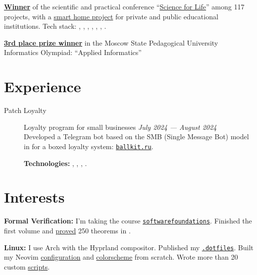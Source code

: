 \documentclass[margin,line]{resume}
\begin{document}
\begin{resume}
  \textbf{\href{https://alchemmist.github.io/CV/attachments/scince-for-life-win.pdf}{Winner}}
  of the scientific and practical conference
  “\href{https://conf.profil.mos.ru/academ}{Science for Life}” among
  117 projects, with a
  \href{https://github.com/smart-cab/}{smart home project} for
  private and public educational institutions.
  Tech stack: ,
  , , ,
  , , .

  \textbf{\href{https://alchemmist.github.io/CV/attachments/informatics-olimpic.pdf}{3rd
  place prize winner}} in the Moscow State Pedagogical University
  Informatics Olympiad: “Applied Informatics”

  \vspace{-2mm}
  \section{\mysidestyle Experience}\vspace{2mm}

  \begin{description}

    \item[Patch Loyalty] Loyalty program for small businesses \hfill
      \textsl{July 2024 — August 2024\vspace{1mm}}\\
      Developed a Telegram bot based on the SMB (Single Message Bot)
      model in  for a boxed loyalty system:
      \href{https://ballkit.ru}{\texttt{ballkit.ru}}.

      \textbf{Technologies:}
      ,
      , ,
      .
  \end{description}
  \vspace{-4mm}
  \section{\mysidestyle Interests}\vspace{0.7mm}

  {\textbf{Formal Verification:} I'm taking the course
    \texttt{\href{https://softwarefoundations.cis.upenn.edu}{softwarefoundations}}.
    Finished the first volume and
    \href{https://github.com/alchemmist/coq-learning}{proved} 250
  theorems in .} \\

  \vspace{-6mm}

  \textbf{Linux:} I use Arch with the Hyprland compositor. Published my
  \href{https:/github.com/alchemmist/.dotfiles}{\texttt{.dotfiles}}.
  Built my Neovim
  \href{https://github.com/alchemmist/.dotfiles/tree/main/nvim}{configuration}
  and
  \href{https://github.com/alchemmist/nothing.nvim}{colorscheme} from scratch.
  Wrote more than 20 custom
  \href{https://github.com/alchemmist/.dotfiles/tree/main/scripts}{scripts}.

\end{resume}
\end{document}

